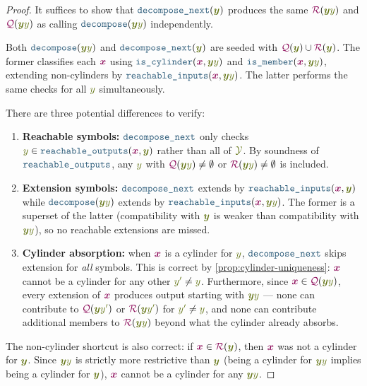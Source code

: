 \documentclass{article}
\theoremstyle{plain}
\newcommand{\Quotient}{{\color{TokenColor}\mathcal{Q}}}
\newcommand{\Remainder}{{\color{TokenColor}\mathcal{R}}}
\newcommand{\srcStr}{\ensuremath{{\color{TokenColor}\boldsymbol{x}}}\xspace}
\newcommand{\tgtSym}{{\color{CharacterColor}y}}
\newcommand{\tgtSymp}{{\color{CharacterColor}y^\prime}}
\newcommand{\tgtStr}{{\color{CharacterColor}\boldsymbol{y}}}
\newcommand{\tgtAlphabet}[0]{{\color{CharacterColor}\ensuremath{\mathcal{Y}}}\xspace}
\newcommand{\myMintedFunc}[1]{\mbox{\texttt{{\color{StormBlue}#1}}}}
\newcommand{\continuous}[0]{\myMintedFunc{is\_cylinder}}
\newcommand{\discontinuous}[0]{\myMintedFunc{is\_member}}
\newcommand{\decompose}[0]{\myMintedFunc{decompose}}
\newcommand{\reachableOutputs}[0]{\myMintedFunc{reachable\_outputs}}
\newcommand{\reachableInputs}[0]{\myMintedFunc{reachable\_inputs}}
\newcommand{\decomposeNext}[0]{\myMintedFunc{decompose\_next}}
\begin{document}
\begin{proof}
It suffices to show that $\decomposeNext(\tgtStr)$ produces the same
$\Remainder(\tgtStr\tgtSym)$ and $\Quotient(\tgtStr\tgtSym)$ as calling
$\decompose(\tgtStr\tgtSym)$ independently.

Both $\decompose(\tgtStr\tgtSym)$ and $\decomposeNext(\tgtStr)$ are seeded
with $\Quotient(\tgtStr) \cup \Remainder(\tgtStr)$.
The former classifies each $\srcStr$ using $\continuous(\srcStr,
\tgtStr\tgtSym)$ and $\discontinuous(\srcStr, \tgtStr\tgtSym)$, extending
non-cylinders by $\reachableInputs(\srcStr, \tgtStr\tgtSym)$.
The latter performs the same checks for all $\tgtSym$ simultaneously.

There are three potential differences to verify:
\begin{enumerate}
\item \textbf{Reachable symbols:} $\decomposeNext$ only checks
  $\tgtSym \in \reachableOutputs(\srcStr, \tgtStr)$ rather than all of
  $\tgtAlphabet$.
  By soundness of $\reachableOutputs$, any $\tgtSym$ with
  $\Quotient(\tgtStr\tgtSym) \ne \emptyset$ or
  $\Remainder(\tgtStr\tgtSym) \ne \emptyset$ is included.

\item \textbf{Extension symbols:} $\decomposeNext$ extends by
  $\reachableInputs(\srcStr, \tgtStr)$ while $\decompose(\tgtStr\tgtSym)$
  extends by $\reachableInputs(\srcStr, \tgtStr\tgtSym)$.
  The former is a superset of the latter (compatibility with $\tgtStr$ is weaker
  than compatibility with $\tgtStr\tgtSym$), so no reachable extensions are
  missed.

\item \textbf{Cylinder absorption:} when $\srcStr$ is a cylinder for $\tgtSym$,
  $\decomposeNext$ skips extension for \emph{all} symbols.
  This is correct by
  \cref{prop:cylinder-uniqueness}: $\srcStr$ cannot be a cylinder for any other
  $\tgtSymp \ne \tgtSym$.
  Furthermore, since $\srcStr \in \Quotient(\tgtStr\tgtSym)$, every extension
  of $\srcStr$ produces output starting with $\tgtStr\tgtSym$ --- none can
  contribute to $\Quotient(\tgtStr\tgtSymp)$ or $\Remainder(\tgtStr\tgtSymp)$
  for $\tgtSymp \ne \tgtSym$, and none can contribute additional members to
  $\Remainder(\tgtStr\tgtSym)$ beyond what the cylinder already absorbs.
\end{enumerate}

\noindent
The non-cylinder shortcut is also correct: if $\srcStr \in \Remainder(\tgtStr)$,
then $\srcStr$ was not a cylinder for $\tgtStr$.
Since $\tgtStr\tgtSym$ is strictly more restrictive than $\tgtStr$ (being a
cylinder for $\tgtStr\tgtSym$ implies being a cylinder for $\tgtStr$),
$\srcStr$ cannot be a cylinder for any $\tgtStr\tgtSym$.
\end{proof}
\end{document}

